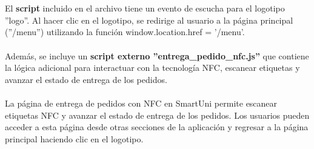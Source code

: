\documentclass[12pt]{report}
\begin{document}
\\\\El \textbf{script}  incluido en el archivo tiene un evento de escucha para el logotipo ''logo''. Al hacer clic en el logotipo, se redirige al usuario a la página principal (''/menu'') utilizando la función window.location.href = '/menu'.
\\\\Además, se incluye un \textbf{script externo ''entrega\_pedido\_nfc.js''} que contiene la lógica adicional para interactuar con la tecnología NFC, escanear etiquetas y avanzar el estado de entrega de los pedidos.
\\\\
La página de entrega de pedidos con NFC en SmartUni permite escanear etiquetas NFC y avanzar el estado de entrega de los pedidos. Los usuarios pueden acceder a esta página desde otras secciones de la aplicación y regresar a la página principal haciendo clic en el logotipo.
\end{document}

